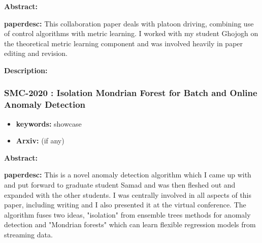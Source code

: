 \documentclass{article}
\begin{document}

\textbf{Abstract:} 

\textbf{paperdesc:} This collaboration paper deals with platoon driving, combining use of control algorithms with metric learning. I worked with my student Ghojogh on the theoretical metric learning component and was involved heavily in paper editing and revision.

\textbf{Description:} 



\newpage
\subsubsection{\textbf{SMC-2020} : Isolation Mondrian Forest for Batch and Online Anomaly Detection}
\begin{itemize}
\item \textbf{keywords:} showcase
\item \textbf{Arxiv:}  (if any)
\end{itemize}


\textbf{Abstract:} 

\textbf{paperdesc:} This is a novel anomaly detection algorithm which I came up with and put forward to graduate student Samad and was then fleshed out and expanded with the other students. I was centrally involved in all aspects of this paper, including writing and I also presented it at the virtual conference. The algorithm fuses two ideas, "isolation" from ensemble trees methods for anomaly detection and "Mondrian forests" which can learn flexible regression models from streaming data.
\end{document}
